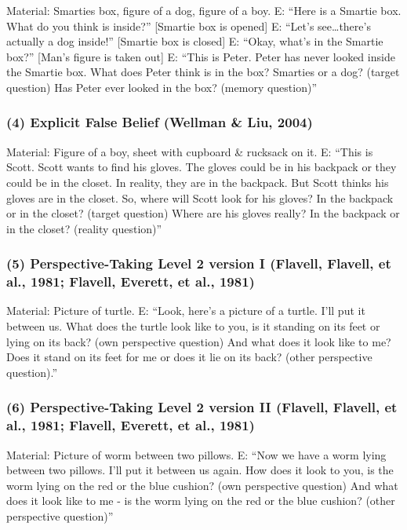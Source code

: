 \documentclass[
  man,floatsintext]{apa7}
\begin{document}
Material: Smarties box, figure of a dog, figure of a boy.
E: ``Here is a Smartie box. What do you think is inside?'' {[}Smartie box is opened{]} E: ``Let's see\ldots there's actually a dog inside!'' {[}Smartie box is closed{]} E: ``Okay, what's in the Smartie box?'' {[}Man's figure is taken out{]} E: ``This is Peter. Peter has never looked inside the Smartie box. What does Peter think is in the box? Smarties or a dog? (target question) Has Peter ever looked in the box? (memory question)''

\subsubsection{(4) Explicit False Belief (Wellman \& Liu, 2004)}\label{explicit-false-belief-wellman2004scaling}

Material: Figure of a boy, sheet with cupboard \& rucksack on it.
E: ``This is Scott. Scott wants to find his gloves. The gloves could be in his backpack or they could be in the closet. In reality, they are in the backpack. But Scott thinks his gloves are in the closet. So, where will Scott look for his gloves? In the backpack or in the closet? (target question) Where are his gloves really? In the backpack or in the closet? (reality question)''

\subsubsection{(5) Perspective-Taking Level 2 version I (Flavell, Flavell, et al., 1981; Flavell, Everett, et al., 1981)}\label{perspective-taking-level-2-version-i-flavell1981development-flavell1981younga}

Material: Picture of turtle.
E: ``Look, here's a picture of a turtle. I'll put it between us. What does the turtle look like to you, is it standing on its feet or lying on its back? (own perspective question) And what does it look like to me? Does it stand on its feet for me or does it lie on its back? (other perspective question).''

\subsubsection{(6) Perspective-Taking Level 2 version II (Flavell, Flavell, et al., 1981; Flavell, Everett, et al., 1981)}\label{perspective-taking-level-2-version-ii-flavell1981development-flavell1981younga}

Material: Picture of worm between two pillows.
E: ``Now we have a worm lying between two pillows. I'll put it between us again. How does it look to you, is the worm lying on the red or the blue cushion? (own perspective question) And what does it look like to me - is the worm lying on the red or the blue cushion? (other perspective question)''
\end{document}
